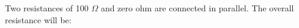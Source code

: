 Two resistances of 100 $\Omega$ and zero ohm are connected in parallel. 
The overall resistance will be: